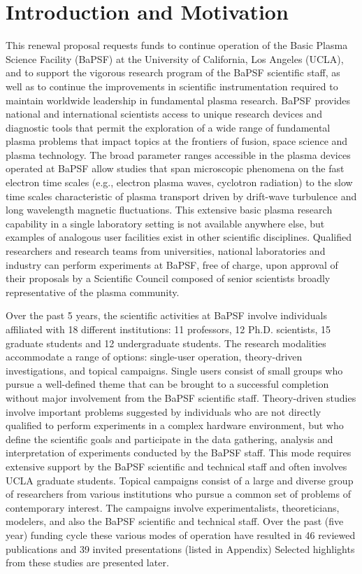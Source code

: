 \documentclass[11pt]{article}
\date{}
\title{}
\begin{document}
\section{Introduction and Motivation}

This renewal proposal requests funds to continue operation of the Basic
Plasma Science Facility (BaPSF) at the University of California, Los
Angeles (UCLA), and to support the vigorous research program of the
BaPSF scientific staff, as well as to continue the improvements in
scientific instrumentation required to maintain worldwide leadership in
fundamental plasma research.  BaPSF provides national and international scientists access to unique
research devices and diagnostic tools that permit the exploration of a
wide range of fundamental plasma problems that impact topics at the
frontiers of fusion, space science and plasma technology. The broad
parameter ranges accessible in the plasma devices operated at BaPSF
allow studies that span microscopic phenomena on the fast electron time
scales (e.g., electron plasma waves, cyclotron radiation) to the slow
time scales characteristic of plasma transport driven by drift-wave
turbulence and long wavelength magnetic fluctuations. This extensive
basic plasma research capability in a single laboratory setting is not
available anywhere else, but examples of analogous user facilities exist
in other scientific disciplines. Qualified researchers and research
teams from universities, national laboratories and industry can perform
experiments at BaPSF, free of charge, upon approval of their proposals
by a Scientific Council composed of senior scientists broadly
representative of the plasma community.

Over the past 5 years, the scientific activities at BaPSF involve
individuals affiliated with 18 different institutions: 11 professors,
12 Ph.D. scientists, 15 graduate students and 12 undergraduate
students.  The research modalities accommodate a range of options:
single-user operation, theory-driven investigations, and topical
campaigns. Single users consist of small groups who pursue a
well-defined theme that can be brought to a successful completion
without major involvement from the BaPSF scientific
staff. Theory-driven studies involve important problems suggested by
individuals who are not directly qualified to perform experiments in a
complex hardware environment, but who define the scientific goals and
participate in the data gathering, analysis and interpretation of
experiments conducted by the BaPSF staff. This mode requires extensive
support by the BaPSF scientific and technical staff and often involves
UCLA graduate students. Topical campaigns consist of a large and
diverse group of researchers from various institutions who pursue a
common set of problems of contemporary interest. The campaigns involve
experimentalists, theoreticians, modelers, and also the BaPSF
scientific and technical staff. Over the past (five year) funding
cycle these various modes of operation have resulted in 46 reviewed
publications and 39 invited presentations (listed in Appendix)
Selected highlights from these studies are presented later.
\end{document}
